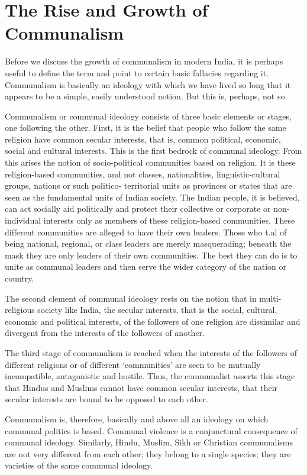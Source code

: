 
\chapter{The Rise and Growth of Communalism}



Before we discuss the growth of communalism in modern India, it is perhaps useful to define the term and point to certain basic fallacies regarding it. Communalism is basically an ideology with which we have lived so long that it appears to be a simple, easily understood notion. But this is, perhaps, not so. 

Communalism or communal ideology consists of three basic elements or stages, one following the other. First, it is the belief that people who follow the same religion have common secular interests, that is, common political, economic, social and cultural interests. This is the first bedrock of communal ideology. From this arises the notion of socio-political communities based on religion. It is these religion-based communities, and not classes, nationalities, linguistic-cultural groups, nations or such politico- territorial units as provinces or states that are seen as the fundamental units of Indian society. The Indian people, it is believed, can act socially aid politically and protect their collective or corporate or non-individual interests only as members of these religion-based communities. These different communities are alleged to have their own leaders. Those who t.al of being national, regional, or class leaders are merely masquerading; beneath the mask they are only leaders of their own communities. The best they can do is to unite as communal leaders and then serve the wider category of the nation or country. 

The second clement of communal ideology rests on the notion that in multi-religious society like India, the secular interests, that is the social, cultural, economic and political interests, of the followers of one religion are dissimilar and divergent from the interests of the followers of another. 

The third stage of communalism is reached when the interests of the followers of different religions or of different `communities' are seen to be mutually incompatible, antagonistic and hostile. Thus, the communalist asserts this stage that Hindus and Muslims cannot have common secular interests, that their secular interests are bound to be opposed to each other. 

Communalism is, therefore, basically and above all an ideology on which communal politics is based. Communal violence is a conjunctural consequence of communal ideology. Similarly, Hindu, Muslim, Sikh or Christian communalisms are not very different from each other; they belong to a single species; they are varieties of the same communal ideology. 

